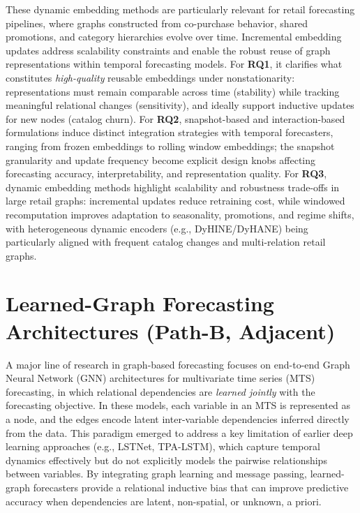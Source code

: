 These dynamic embedding methods are particularly relevant for retail forecasting pipelines, where graphs constructed from co-purchase behavior, shared promotions, and category hierarchies evolve over time. Incremental embedding updates address scalability constraints and enable the robust reuse of graph representations within temporal forecasting models. For \textbf{RQ1}, it clarifies what constitutes \emph{high-quality} reusable embeddings under nonstationarity: representations must remain comparable across time (stability) while tracking meaningful relational changes (sensitivity), and ideally support inductive updates for new nodes (catalog churn). For \textbf{RQ2}, snapshot-based and interaction-based formulations induce distinct integration strategies with temporal forecasters, ranging from frozen embeddings to rolling window embeddings; the snapshot granularity and update frequency become explicit design knobs affecting forecasting accuracy, interpretability, and representation quality. For \textbf{RQ3}, dynamic embedding methods highlight scalability and robustness trade-offs in large retail graphs: incremental updates reduce retraining cost, while windowed recomputation improves adaptation to seasonality, promotions, and regime shifts, with heterogeneous dynamic encoders (e.g., DyHINE/DyHANE) being particularly aligned with frequent catalog changes and multi-relation retail graphs.



\section{Learned-Graph Forecasting Architectures (Path-B, Adjacent)}
\label{sec:learned-graph-pathb}

A major line of research in graph-based forecasting focuses on end-to-end Graph Neural Network (GNN) architectures for
multivariate time series (MTS) forecasting, in which relational dependencies are \emph{learned jointly} with the
forecasting objective. In these models, each variable in an MTS is represented as a node, and the edges encode latent inter-variable dependencies inferred directly from the data. This paradigm emerged to address a key limitation of
earlier deep learning approaches (e.g., LSTNet, TPA-LSTM), which capture temporal dynamics effectively but do not
explicitly models the pairwise relationships between variables. By integrating graph learning and message passing, learned-graph
forecasters provide a relational inductive bias that can improve predictive accuracy when dependencies are latent,
non-spatial, or unknown, a priori.

